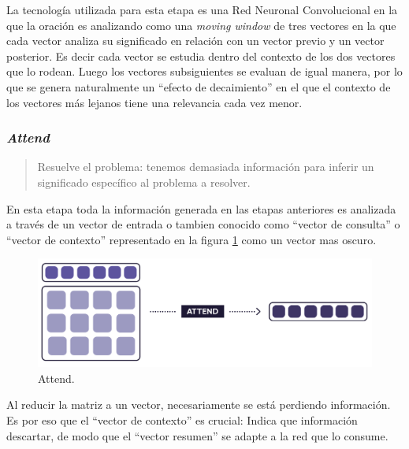\documentclass[12pt,a4paper,]{scrartcl}
\begin{document}
La tecnología utilizada para esta etapa es una Red Neuronal Convolucional en la que la oración es analizando como una \emph{moving window} de tres vectores en la que cada vector analiza su significado en relación con un vector previo y un vector posterior. Es decir cada vector se estudia dentro del contexto de los dos vectores que lo rodean. Luego los vectores subsiguientes se evaluan de igual manera, por lo que se genera naturalmente un \enquote{efecto de decaimiento} en el que el contexto de los vectores más lejanos tiene una relevancia cada vez menor.

\hypertarget{attend}{%
\subsubsection{\texorpdfstring{\emph{Attend}}{Attend}}\label{attend}}

\begin{quote}
Resuelve el problema: tenemos demasiada información para inferir un significado específico al problema a resolver.
\end{quote}

En esta etapa toda la información generada en las etapas anteriores es analizada a través de un vector de entrada o tambien conocido como \enquote{vector de consulta} o \enquote{vector de contexto} representado en la figura \ref{fig:formula-attend} como un vector mas oscuro.

\begin{figure}[H]

{\centering \includegraphics{assets/deep-learning-formula-nlp_attend.pdf} 

}

\caption{Attend.}\label{fig:formula-attend}
\end{figure}

Al reducir la matriz a un vector, necesariamente se está perdiendo información. Es por eso que el \enquote{vector de contexto} es crucial: Indica que información descartar, de modo que el \enquote{vector resumen} se adapte a la red que lo consume.
\end{document}
